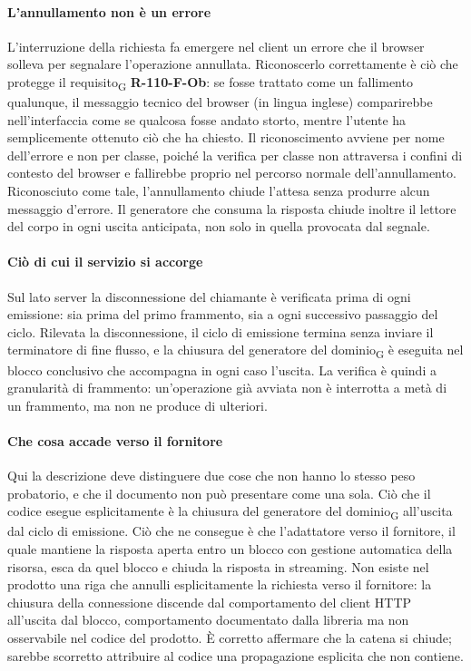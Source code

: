 \documentclass[a4paper, 10pt]{article}
\begin{document}
\paragraph{L'annullamento non è un errore}
L'interruzione della richiesta fa emergere nel client un errore che il browser solleva per segnalare l'operazione annullata. Riconoscerlo correttamente è ciò che protegge il requisito\textsubscript{G} \textbf{R-110-F-Ob}: se fosse trattato come un fallimento qualunque, il messaggio tecnico del browser (in lingua inglese) comparirebbe nell'interfaccia come se qualcosa fosse andato storto, mentre l'utente ha semplicemente ottenuto ciò che ha chiesto. Il riconoscimento avviene per nome dell'errore e non per classe, poiché la verifica per classe non attraversa i confini di contesto del browser e fallirebbe proprio nel percorso normale dell'annullamento. Riconosciuto come tale, l'annullamento chiude l'attesa senza produrre alcun messaggio d'errore. Il generatore che consuma la risposta chiude inoltre il lettore del corpo in ogni uscita anticipata, non solo in quella provocata dal segnale.

\paragraph{Ciò di cui il servizio si accorge}
Sul lato server la disconnessione del chiamante è verificata prima di ogni emissione: sia prima del primo frammento, sia a ogni successivo passaggio del ciclo. Rilevata la disconnessione, il ciclo di emissione termina senza inviare il terminatore di fine flusso, e la chiusura del generatore del dominio\textsubscript{G} è eseguita nel blocco conclusivo che accompagna in ogni caso l'uscita. La verifica è quindi a granularità di frammento: un'operazione già avviata non è interrotta a metà di un frammento, ma non ne produce di ulteriori.

\paragraph{Che cosa accade verso il fornitore}
Qui la descrizione deve distinguere due cose che non hanno lo stesso peso probatorio, e che il documento non può presentare come una sola. Ciò che il codice esegue esplicitamente è la chiusura del generatore del dominio\textsubscript{G} all'uscita dal ciclo di emissione. Ciò che ne consegue è che l'adattatore verso il fornitore, il quale mantiene la risposta aperta entro un blocco con gestione automatica della risorsa, esca da quel blocco e chiuda la risposta in streaming. Non esiste nel prodotto una riga che annulli esplicitamente la richiesta verso il fornitore: la chiusura della connessione discende dal comportamento del client HTTP all'uscita dal blocco, comportamento documentato dalla libreria ma non osservabile nel codice del prodotto. È corretto affermare che la catena si chiude; sarebbe scorretto attribuire al codice una propagazione esplicita che non contiene.
\end{document}
